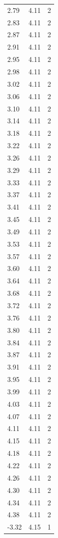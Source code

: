 \begin{longtable}{lrr}
  2.79 & 4.11 & 2 \\
  2.83 & 4.11 & 2 \\
  2.87 & 4.11 & 2 \\
  2.91 & 4.11 & 2 \\
  2.95 & 4.11 & 2 \\
  2.98 & 4.11 & 2 \\
  3.02 & 4.11 & 2 \\
  3.06 & 4.11 & 2 \\
  3.10 & 4.11 & 2 \\
  3.14 & 4.11 & 2 \\
  3.18 & 4.11 & 2 \\
  3.22 & 4.11 & 2 \\
  3.26 & 4.11 & 2 \\
  3.29 & 4.11 & 2 \\
  3.33 & 4.11 & 2 \\
  3.37 & 4.11 & 2 \\
  3.41 & 4.11 & 2 \\
  3.45 & 4.11 & 2 \\
  3.49 & 4.11 & 2 \\
  3.53 & 4.11 & 2 \\
  3.57 & 4.11 & 2 \\
  3.60 & 4.11 & 2 \\
  3.64 & 4.11 & 2 \\
  3.68 & 4.11 & 2 \\
  3.72 & 4.11 & 2 \\
  3.76 & 4.11 & 2 \\
  3.80 & 4.11 & 2 \\
  3.84 & 4.11 & 2 \\
  3.87 & 4.11 & 2 \\
  3.91 & 4.11 & 2 \\
  3.95 & 4.11 & 2 \\
  3.99 & 4.11 & 2 \\
  4.03 & 4.11 & 2 \\
  4.07 & 4.11 & 2 \\
  4.11 & 4.11 & 2 \\
  4.15 & 4.11 & 2 \\
  4.18 & 4.11 & 2 \\
  4.22 & 4.11 & 2 \\
  4.26 & 4.11 & 2 \\
  4.30 & 4.11 & 2 \\
  4.34 & 4.11 & 2 \\
  4.38 & 4.11 & 2 \\
  -3.32 & 4.15 & 1 \\

\end{longtable}
